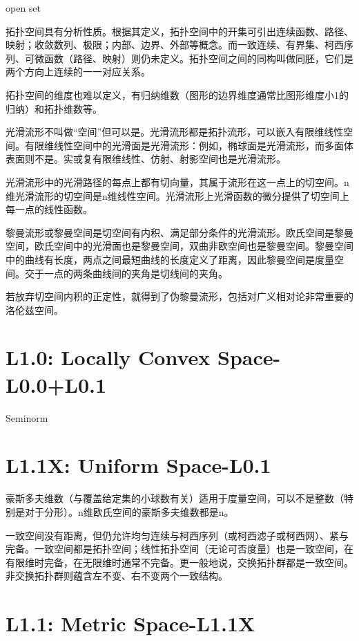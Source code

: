 \documentclass[UTF8]{../../09-Mathematics}
\begin{document}
open set


拓扑空间具有分析性质。根据其定义，拓扑空间中的开集可引出连续函数、路径、映射；收敛数列、极限；内部、边界、外部等概念。而一致连续、有界集、柯西序列、可微函数（路径、映射）则仍未定义。拓扑空间之间的同构叫做同胚，它们是两个方向上连续的一一对应关系。



拓扑空间的维度也难以定义，有归纳维数（图形的边界维度通常比图形维度小1的归纳）和拓扑维数等。



光滑流形不叫做“空间”但可以是。光滑流形都是拓扑流形，可以嵌入有限维线性空间。有限维线性空间中的光滑面是光滑流形：例如，椭球面是光滑流形，而多面体表面则不是。实或复有限维线性、仿射、射影空间也是光滑流形。

光滑流形中的光滑路径的每点上都有切向量，其属于流形在这一点上的切空间。n维光滑流形的切空间是n维线性空间。光滑流形上光滑函数的微分提供了切空间上每一点的线性函数。

黎曼流形或黎曼空间是切空间有内积、满足部分条件的光滑流形。欧氏空间是黎曼空间，欧氏空间中的光滑面也是黎曼空间，双曲非欧空间也是黎曼空间。黎曼空间中的曲线有长度，两点之间最短曲线的长度定义了距离，因此黎曼空间是度量空间。交于一点的两条曲线间的夹角是切线间的夹角。

若放弃切空间内积的正定性，就得到了伪黎曼流形，包括对广义相对论非常重要的洛伦兹空间。






\chapter{L1.0: Locally Convex Space-L0.0+L0.1}

Seminorm



\chapter{L1.1X: Uniform Space-L0.1}


豪斯多夫维数（与覆盖给定集的小球数有关）适用于度量空间，可以不是整数（特别是对于分形）。n维欧氏空间的豪斯多夫维数都是n。

一致空间没有距离，但仍允许均匀连续与柯西序列（或柯西滤子或柯西网）、紧与完备。一致空间都是拓扑空间；线性拓扑空间（无论可否度量）也是一致空间，在有限维时完备，在无限维时通常不完备。更一般地说，交换拓扑群都是一致空间。非交换拓扑群则蕴含左不变、右不变两个一致结构。


\chapter{L1.1: Metric Space-L1.1X}
\end{document}
